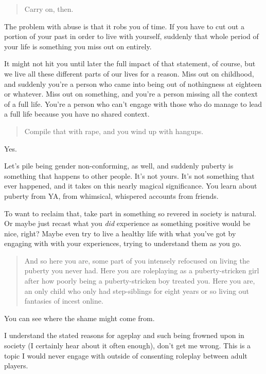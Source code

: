 \begin{quote}
Carry on, then.
\end{quote}

The problem with abuse is that it robs you of time. If you have to cut out a portion of your past in order to live with yourself, suddenly that whole period of your life is something you miss out on entirely.

It might not hit you until later the full impact of that statement, of course, but we live all these different parts of our lives for a reason. Miss out on childhood, and suddenly you're a person who came into being out of nothingness at eighteen or whatever. Miss out on something, and you're a person missing all the context of a full life. You're a person who can't engage with those who do manage to lead a full life because you have no shared context.

\begin{quote}
Compile that with rape, and you wind up with hangups.
\end{quote}

Yes.

Let's pile being gender non-conforming, as well, and suddenly puberty is something that happens to other people. It's not yours. It's not something that ever happened, and it takes on this nearly magical significance. You learn about puberty from YA, from whimsical, whispered accounts from friends.

To want to reclaim that, take part in something so revered in society is natural. Or maybe just recast what you \emph{did} experience as something positive would be nice, right? Maybe even try to live a healthy life with what you've got by engaging with with your experiences, trying to understand them as you go.

\begin{quote}
And so here you are, some part of you intensely refocused on living the puberty you never had. Here you are roleplaying as a puberty-stricken girl after how poorly being a puberty-stricken boy treated you. Here you are, an only child who only had step-siblings for eight years or so living out fantasies of incest online.
\end{quote}

You can see where the shame might come from.

I understand the stated reasons for ageplay and such being frowned upon in society (I certainly hear about it often enough), don't get me wrong. This is a topic I would never engage with outside of consenting roleplay between adult players.

